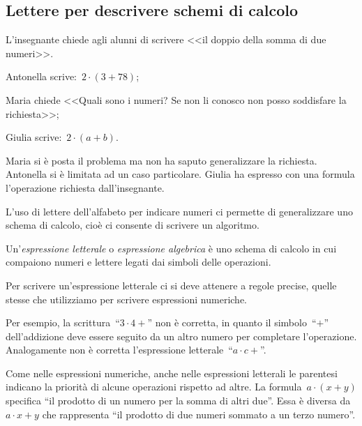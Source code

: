 \subsection{Lettere per descrivere schemi di calcolo}
\begin{exrig}
 \begin{esempio}
 L'insegnante chiede agli alunni di scrivere <<il doppio della somma di due numeri>>.

\begin{itemize*}
\item Antonella scrive:~$2\cdot (3+78)$;
\item Maria chiede <<Quali sono i numeri? Se non li conosco non posso soddisfare la richiesta>>;
\item Giulia scrive:~$2\cdot (a+b)$.
\end{itemize*}
Maria si è posta il problema ma non ha saputo generalizzare la richiesta. Antonella si è limitata ad un caso
particolare. Giulia ha espresso con una formula l'operazione richiesta dall'insegnante.
 \end{esempio}
\end{exrig}

\osservazione L'uso di lettere dell'alfabeto per indicare numeri ci permette di generalizzare uno schema di calcolo, cioè ci consente di scrivere un algoritmo.

\begin{definizione}
 Un'\emph{espressione letterale} o \emph{espressione algebrica} è uno schema di calcolo in cui compaiono numeri e lettere
legati dai simboli delle operazioni.
\end{definizione}

Per scrivere un'espressione letterale ci si deve attenere a regole precise, quelle stesse che utilizziamo per scrivere
espressioni numeriche.

Per esempio, la scrittura~``$3\cdot 4+$'' non è corretta, in quanto il simbolo~``$+$'' dell'addizione deve essere seguito da un
altro numero per completare l'operazione. Analogamente non è corretta l'espressione letterale~``$a\cdot c+$''.

Come nelle espressioni numeriche, anche nelle espressioni letterali le parentesi indicano la priorità di alcune operazioni rispetto ad altre.
La formula~$a\cdot (x+y)$ specifica ``il prodotto di un numero per la somma di altri due''. Essa è diversa da  $a\cdot x+y$
che rappresenta ``il prodotto di due numeri sommato a un terzo numero''.

\vspazio\ovalbox{\risolvii \ref{ese:9.2}, \ref{ese:9.3}}

